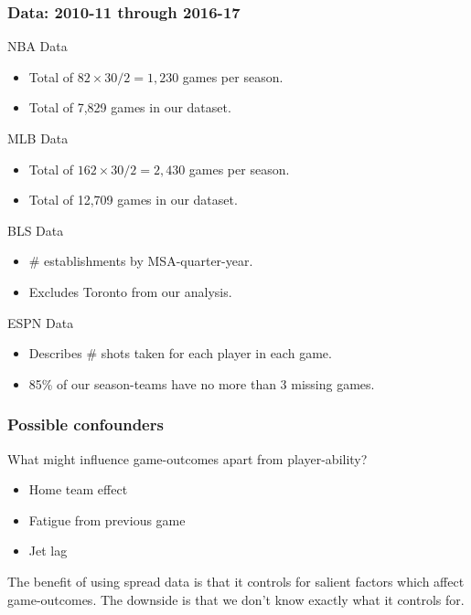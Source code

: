 \documentclass{beamer}
\begin{document}
\begin{frame}   \frametitle{Data: 2010-11 through 2016-17}
  \begin{block}{NBA Data}     \begin{itemize}       \item Total of $82 \times 30 / 2 = 1,230$ games per season.
      \item Total of 7,829 games in our dataset.     \end{itemize}
  \end{block} 
  \begin{block}{MLB Data}     \begin{itemize}       \item Total of $162 \times 30 / 2 = 2,430$ games per season.
      \item Total of 12,709 games in our dataset.     \end{itemize}   \end{block}
  \begin{block}{BLS Data}
    \begin{itemize}       \item \# establishments by MSA-quarter-year.
      \item Excludes Toronto from our analysis.     \end{itemize}   \end{block}
  \begin{block}{ESPN Data}     \begin{itemize}       \item Describes \# shots taken for each player in each game.
      \item 85\% of our season-teams have no more than 3 missing games.     \end{itemize}   \end{block} \end{frame}

\begin{frame}
  \frametitle{Possible confounders}
  What might influence game-outcomes apart from player-ability?

  \vspace{12pt}\begin{itemize}     
    \item Home team effect
    \item Fatigue from previous game
    \item Jet lag   
    \end{itemize}

  \vspace{12pt}The benefit of using spread data is that it controls for salient factors which affect game-outcomes.
  The downside is that we don't know exactly what it controls for. \end{frame}
\end{document}
